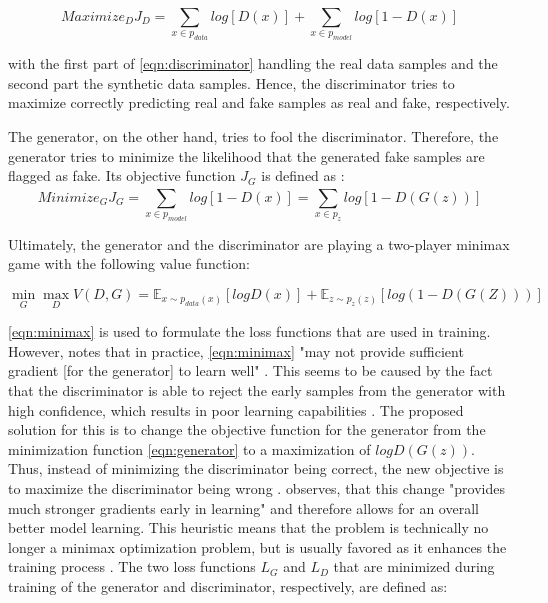 \begin{equation}
    \label{eqn:discriminator}
    Maximize_DJ_D= \sum_{x\in p_{data}}^{} log [D(x)] + \sum_{x\in p_{model}}^{} log [1-D(x)]
\end{equation}

with the first part of \autoref{eqn:discriminator} handling the real data samples and the second part the synthetic data samples.
Hence, the discriminator tries to maximize correctly predicting real and fake samples as real and fake, respectively.

The generator, on the other hand, tries to fool the discriminator.
Therefore, the generator tries to minimize the likelihood that the generated fake samples are flagged as fake.
Its objective function $J_G$ is defined as \cite{aggarwal2018NeuralNetworksDeep}:
\begin{equation}
    \label{eqn:generator}
    Minimize_GJ_G= \sum_{x\in p_{model}}^{} log [1-D(x)] = \sum_{x\in p_z}^{} log [1-D(G(z))]
\end{equation}

Ultimately, the generator and the discriminator are playing a two-player minimax game with the following value function:

\begin{equation}
    \label{eqn:minimax}
    \min_G\max_DV(D,G)=\mathbb{E}_{x\sim p_{data}(x)} [log D(x)] + \mathbb{E}_{z\sim p_z(z)}[log( 1-D(G(Z)))]
\end{equation}

\autoref{eqn:minimax} is used to formulate the loss functions that are used in training.
However, \cite{NIPS2014_5ca3e9b1} notes that in practice, \autoref{eqn:minimax} "may not provide sufficient gradient [for the generator] to learn well" \cite[p. 3]{NIPS2014_5ca3e9b1}.
This seems to be caused by the fact that the discriminator is able to reject the early samples from the generator with high confidence, which results in poor learning capabilities \cite{NIPS2014_5ca3e9b1}.
The proposed solution for this is to change the objective function for the generator from the minimization function \autoref{eqn:generator} to a maximization of $logD(G(z))$.
Thus, instead of minimizing the discriminator being correct, the new objective is to maximize the discriminator being wrong \cite{NIPS2014_5ca3e9b1}. 
\textcite[p. 3]{NIPS2014_5ca3e9b1} observes, that this change "provides much stronger gradients early in learning" and therefore allows for an overall better model learning.
This heuristic means that the problem is technically no longer a minimax optimization problem, but is usually favored as it enhances the training process \cite[p. 442]{aggarwal2018NeuralNetworksDeep}.
The two loss functions $L_G$ and $L_D$ that are minimized during training of the generator and discriminator, respectively, are defined as:

